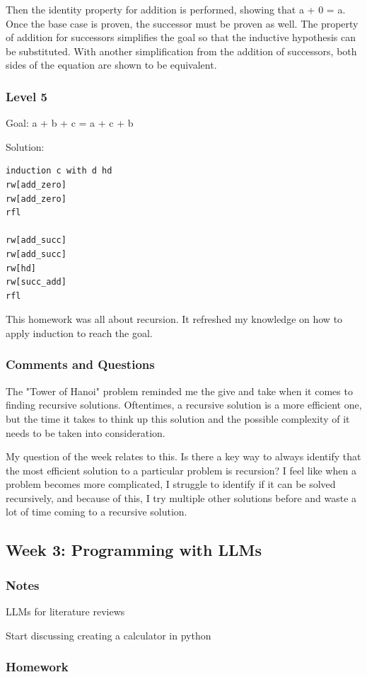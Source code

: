 \documentclass{article}
\theoremstyle{theorem}
\theoremstyle{definition}
\theoremstyle{remark}
\begin{document}
Then the identity property for addition is performed, showing that a + 0 = a.
Once the base case is proven, the successor must be proven as well.
The property of addition for successors simplifies the goal so that the inductive hypothesis can 
be substituted. With another simplification from the addition of successors, both sides of the equation
are shown to be equivalent.
\subsubsection*{Level 5}
Goal: a + b + c = a + c + b

Solution:
\begin{lstlisting}
induction c with d hd
rw[add_zero]
rw[add_zero]
rfl

rw[add_succ]
rw[add_succ]
rw[hd]
rw[succ_add]
rfl
\end{lstlisting}
This homework was all about recursion. It refreshed my knowledge on how to apply induction
to reach the goal.

\subsubsection*{Comments and Questions}
The "Tower of Hanoi" problem reminded me the give and take when it comes to finding 
recursive solutions. Oftentimes, a recursive solution is a more efficient one, but the time
it takes to think up this solution and the possible complexity of it needs to be taken into consideration.

My question of the week relates to this. Is there a key way to always identify that the most efficient solution to
a particular problem is recursion? I feel like when a problem becomes more complicated, I struggle to identify if 
it can be solved recursively, and because of this, I try multiple other solutions before and waste a lot of time
coming to a recursive solution.

\subsection{Week 3: Programming with LLMs}
\subsubsection*{Notes}
LLMs for literature reviews 

Start discussing creating a calculator in python
\subsubsection*{Homework}
\end{document}
